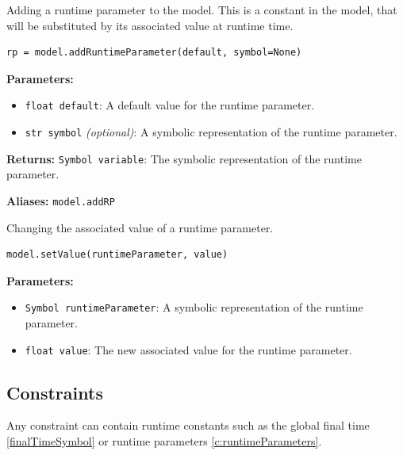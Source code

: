 \documentclass[12pt]{article}
\begin{document}
\begin{mdframed}[backgroundcolor=gray!10, roundcorner=10pt,
		linewidth=1pt]

	Adding a runtime parameter to the model. This is a constant in
	the model, that will be substituted by its associated value at runtime
	time.

	\begin{lstlisting}
rp = model.addRuntimeParameter(default, symbol=None)
		\end{lstlisting}
	\label{addRuntimeParameter}
	\textbf{Parameters:}
	\begin{itemize}
		\item \texttt{float default}: A default value for the
		      runtime parameter.
		\item \texttt{str symbol} \emph{(optional)}: A symbolic
		      representation of
		      the runtime parameter.
	\end{itemize}

	\textbf{Returns:}
	\texttt{Symbol variable}: The symbolic representation of the
	runtime parameter.

	\textbf{Aliases:} \texttt{model.addRP}
\end{mdframed}

\begin{mdframed}[backgroundcolor=gray!10, roundcorner=10pt,
		linewidth=1pt]

	Changing the associated value of a runtime parameter.

	\begin{lstlisting}
model.setValue(runtimeParameter, value)
		\end{lstlisting}
	\label{setValue}
	\textbf{Parameters:}
	\begin{itemize}
		\item \texttt{Symbol runtimeParameter}: A symbolic
		      representation of the runtime parameter.
		\item \texttt{float value}: The new associated value
		      for the runtime parameter.
	\end{itemize}
\end{mdframed}

\subsection{Constraints}

Any constraint can contain runtime constants such as the global
final time \eqref{finalTimeSymbol} or runtime parameters
\eqref{c:runtimeParameters}.
\end{document}

